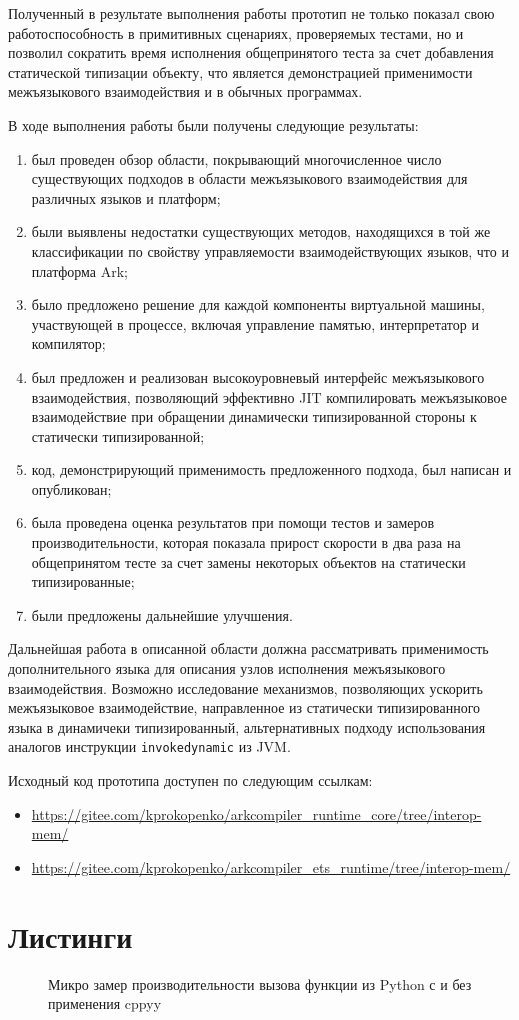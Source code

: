 \documentclass[times
]{itmo-student-thesis}
\begin{document}
\chapterconclusion
Полученный в результате выполнения работы прототип не только показал свою работоспособность в примитивных сценариях, проверяемых тестами, но и позволил сократить время исполнения общепринятого теста за счет добавления статической типизации объекту, что является демонстрацией применимости межъязыкового взаимодействия и в обычных программах.

\startconclusionpage
В ходе выполнения работы были получены следующие результаты:
\begin{enumerate}
	\item был проведен обзор области, покрывающий многочисленное число существующих подходов в области межъязыкового взаимодействия для различных языков и платформ;
	\item были выявлены недостатки существующих методов, находящихся в той же классификации по свойству управляемости взаимодействующих языков, что и платформа Ark;
	\item было предложено решение для каждой компоненты виртуальной машины, участвующей в процессе, включая управление памятью, интерпретатор и компилятор;
	\item был предложен и реализован высокоуровневый интерфейс межъязыкового взаимодействия, позволяющий эффективно JIT компилировать межъязыковое взаимодействие при обращении динамически типизированной стороны к статически типизированной;
	\item код, демонстрирующий применимость предложенного подхода, был написан и опубликован;
	\item была проведена оценка результатов при помощи тестов и замеров производительности, которая показала прирост скорости в два раза на общепринятом тесте за счет замены некоторых объектов на статически типизированные;
	\item были предложены дальнейшие улучшения.
\end{enumerate}

Дальнейшая работа в описанной области должна рассматривать применимость дополнительного языка для описания узлов исполнения межъязыкового взаимодействия. Возможно исследование механизмов, позволяющих ускорить межъязыковое взаимодействие, направленное из статически типизированного языка в динамичеки типизированный, альтернативных подходу использования аналогов инструкции \texttt{invokedynamic} из JVM.

Исходный код прототипа доступен по следующим ссылкам:
\begin{itemize}
	\item \url{https://gitee.com/kprokopenko/arkcompiler_runtime_core/tree/interop-mem/}
	\item \url{https://gitee.com/kprokopenko/arkcompiler_ets_runtime/tree/interop-mem/}
\end{itemize}

\printmainbibliography
\appendix

\chapter{Листинги}
\begin{figure}[!h]
	\caption{Микро замер производительности вызова функции из Python с и без применения cppyy}\label{apx:cppyy-bench}
	
\end{figure}
\end{document}

